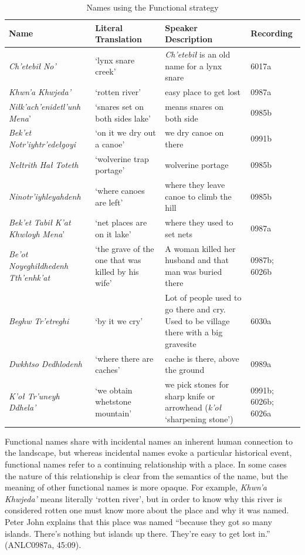 \begin{table}[htb]
\caption{Names using the Functional strategy}
\label{holton:tab:functional}
\small
\begin{tabular}{L{3.5cm} | L{3cm} | L{3cm} | l}
{\bfseries Name} &
{\bfseries Literal Translation} &
{\bfseries Speaker Description} &
{\bfseries Recording}\\\hline

 \textit{Ch’etebił} \textit{No’} &
‘lynx snare creek’ &
\textit{Ch’etebił} is an old name for a lynx snare &
6017a\\
\textit{Khwn’a Khwjeda’}  &
‘rotten river’ &
easy place to get lost &
0987a\\
 \textit{Niłk’ach’enidetl’unh} \textit{Mena}’ &
‘snares set on both sides lake’ &
means snares on both side &
0985b\\
 \textit{Bek’et} \textit{Notr’iyhtr’edełgoyi} &
‘on it we dry out a canoe’ &
we dry canoe on there &
0991b\\
 \textit{Nełtrith} \textit{Hał} \textit{Toteth} &
‘wolverine trap portage’ &
wolverine portage &
0985b\\
\textit{Ninotr’iyhleyahdenh} &
‘where canoes are left’ &
where they leave canoe to climb the hill &
0985b \\
 \textit{Bek’et} \textit{Tabił} \textit{K’at} \textit{Khwloyh} \textit{Mena}’ &
‘net places are on it lake’ &
where they used to set nets &
0987a\\
 \textit{Be’ot} \textit{Noyeghiłdhedenh} \textit{Tth’enhk’at} &
‘the grave of the one that was killed by his wife’ &
A woman killed her husband and that man was buried there &
0987b; 6026b\\
 \textit{Beghw} \textit{Tr’etreghi} &
‘by it we cry’ &
Lot of people used to go there and cry. Used to be village there with a big gravesite &
6030a\\
 \textit{Dwkhtso} \textit{Dedhlodenh} &
‘where there are caches’ &
cache is there, above the ground &
0989a\\
\textit{K’oł Tr’uneyh Ddhela’} &
‘we obtain whetstone mountain’ &
we pick stones for sharp knife or arrowhead (\textit{k’oł} `sharpening stone') &
0991b; 6026b; 6026a\\
\end{tabular}
\end{table}


Functional names share with incidental names an inherent human connection to the landscape, but whereas incidental names evoke a particular historical event, functional names refer to a continuing relationship with a place. In some cases the nature of this relationship is clear from the semantics of the name, but the meaning of other functional names is more opaque. For example, \textit{Khwn’a Khwjeda’} means literally ‘rotten river’, but in order to know why this river is considered rotten one must know more about the place and why it was named. Peter John explains that this place was named “because they got so many islands. There’s nothing but islands up there. They’re easy to get lost in.” (ANLC0987a, 45:09).

